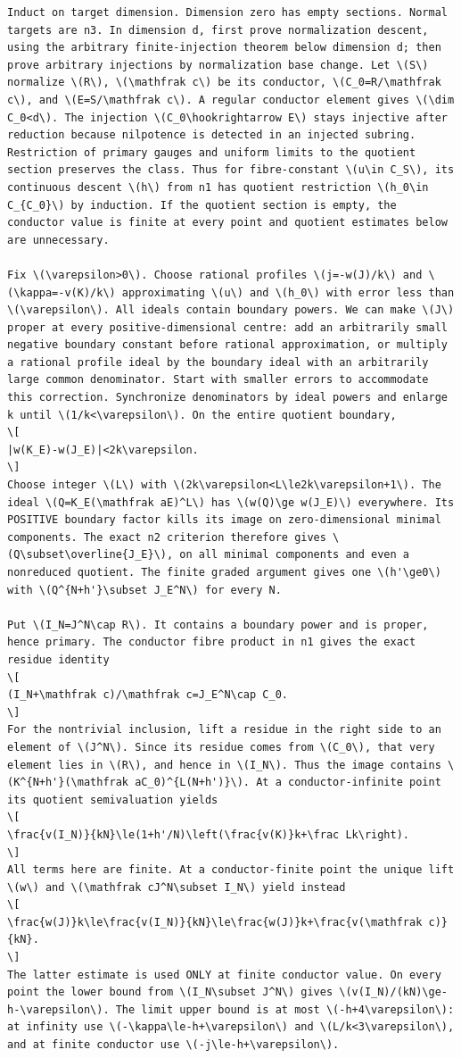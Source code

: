 \documentclass[11pt]{article}
\begin{document}
\begin{Verbatim}[fontsize=\tiny,breaklines=true,breakanywhere=true]
Induct on target dimension. Dimension zero has empty sections. Normal targets are n3. In dimension d, first prove normalization descent, using the arbitrary finite-injection theorem below dimension d; then prove arbitrary injections by normalization base change. Let \(S\) normalize \(R\), \(\mathfrak c\) be its conductor, \(C_0=R/\mathfrak c\), and \(E=S/\mathfrak c\). A regular conductor element gives \(\dim C_0<d\). The injection \(C_0\hookrightarrow E\) stays injective after reduction because nilpotence is detected in an injected subring. Restriction of primary gauges and uniform limits to the quotient section preserves the class. Thus for fibre-constant \(u\in C_S\), its continuous descent \(h\) from n1 has quotient restriction \(h_0\in C_{C_0}\) by induction. If the quotient section is empty, the conductor value is finite at every point and quotient estimates below are unnecessary.

Fix \(\varepsilon>0\). Choose rational profiles \(j=-w(J)/k\) and \(\kappa=-v(K)/k\) approximating \(u\) and \(h_0\) with error less than \(\varepsilon\). All ideals contain boundary powers. We can make \(J\) proper at every positive-dimensional centre: add an arbitrarily small negative boundary constant before rational approximation, or multiply a rational profile ideal by the boundary ideal with an arbitrarily large common denominator. Start with smaller errors to accommodate this correction. Synchronize denominators by ideal powers and enlarge k until \(1/k<\varepsilon\). On the entire quotient boundary,
\[
|w(K_E)-w(J_E)|<2k\varepsilon.
\]
Choose integer \(L\) with \(2k\varepsilon<L\le2k\varepsilon+1\). The ideal \(Q=K_E(\mathfrak aE)^L\) has \(w(Q)\ge w(J_E)\) everywhere. Its POSITIVE boundary factor kills its image on zero-dimensional minimal components. The exact n2 criterion therefore gives \(Q\subset\overline{J_E}\), on all minimal components and even a nonreduced quotient. The finite graded argument gives one \(h'\ge0\) with \(Q^{N+h'}\subset J_E^N\) for every N.

Put \(I_N=J^N\cap R\). It contains a boundary power and is proper, hence primary. The conductor fibre product in n1 gives the exact residue identity
\[
(I_N+\mathfrak c)/\mathfrak c=J_E^N\cap C_0.
\]
For the nontrivial inclusion, lift a residue in the right side to an element of \(J^N\). Since its residue comes from \(C_0\), that very element lies in \(R\), and hence in \(I_N\). Thus the image contains \(K^{N+h'}(\mathfrak aC_0)^{L(N+h')}\). At a conductor-infinite point its quotient semivaluation yields
\[
\frac{v(I_N)}{kN}\le(1+h'/N)\left(\frac{v(K)}k+\frac Lk\right).
\]
All terms here are finite. At a conductor-finite point the unique lift \(w\) and \(\mathfrak cJ^N\subset I_N\) yield instead
\[
\frac{w(J)}k\le\frac{v(I_N)}{kN}\le\frac{w(J)}k+\frac{v(\mathfrak c)}{kN}.
\]
The latter estimate is used ONLY at finite conductor value. On every point the lower bound from \(I_N\subset J^N\) gives \(v(I_N)/(kN)\ge-h-\varepsilon\). The limit upper bound is at most \(-h+4\varepsilon\): at infinity use \(-\kappa\le-h+\varepsilon\) and \(L/k<3\varepsilon\), and at finite conductor use \(-j\le-h+\varepsilon\).


\end{Verbatim}
\end{document}
